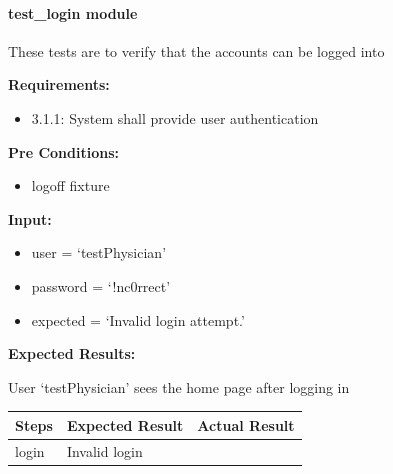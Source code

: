 \documentclass[letterpaper,10pt,english]{sphinxmanual}
\begin{document}
\begin{fulllineitems}
\end{fulllineitems}



\paragraph{test\_login module}
\label{STD/test_login:test-login-module}\label{STD/test_login:module-test_login}\label{STD/test_login::doc}
These tests are to verify that the accounts can be logged into

\begin{fulllineitems}
\label{STD/test_login:test_login.test_login_bad_pass}
\textbf{Requirements:}
\begin{itemize}
\item {} 
3.1.1: System shall provide user authentication

\end{itemize}

\textbf{Pre Conditions:}
\begin{itemize}
\item {} 
logoff fixture

\end{itemize}

\textbf{Input:}
\begin{itemize}
\item {} 
user = `testPhysician'

\item {} 
password = `!nc0rrect'

\item {} 
expected = `Invalid login attempt.'

\end{itemize}

\textbf{Expected Results:}

User `testPhysician' sees the home page after logging in

\begin{tabulary}{\linewidth}{|L|L|L|}
\hline
\textsf{\relax 
Steps
} & \textsf{\relax 
Expected Result
} & \textsf{\relax 
Actual Result
}\\
\hline
login
 & 
Invalid login
 & \\
\hline\end{tabulary}


\end{fulllineitems}
\end{document}
